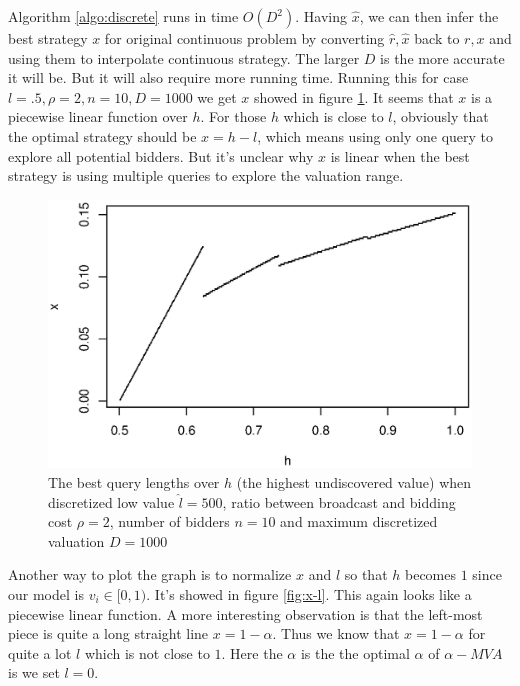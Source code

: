 Algorithm \ref{algo:discrete} runs in time $O(D^2)$. Having $\hat x$, we can
then infer the best strategy $x$ for original continuous problem by converting
$\hat r, \hat x$ back to $r, x$ and using them to interpolate continuous
strategy.  The larger $D$ is the more accurate it will be. But it will also
require more running time.  Running this for case $l = .5, \rho = 2, n = 10, D
= 1000$ we get $x$ showed in figure \ref{fig:x-h}. It seems that $x$ is a
piecewise linear function over $h$.  For those $h$ which is close to
$l$, obviously that the optimal strategy should be $x = h - l$,
which means using only one query to explore all potential bidders. But it's
unclear why $x$ is linear when the best strategy is using multiple queries to
explore the valuation range.

\begin{figure}
\centering
    \includegraphics[trim=0mm 5mm 5mm 15mm, clip, width=\linewidth]{figures/1000-500-2-1-10}
    \caption{The best query lengths over $h$ (the highest
        undiscovered value) when discretized low value $\hat l = 500$,
        ratio between broadcast and bidding cost $\rho = 2$,
        number of bidders $n = 10$ and maximum discretized valuation
        $D = 1000$}\label{fig:x-h}
\end{figure}

Another way to plot the graph is to normalize $x$ and $l$ so that $h$ becomes
$1$ since our model is $v_i \in [0, 1)$. It's showed in figure \ref{fig:x-l}.
This again looks like a piecewise linear function.  A more interesting
observation is that the left-most piece is quite a long straight line $x =
1-\alpha$. Thus we know that $x = 1-\alpha$ for quite a lot $l$ which is not
close to $1$. Here the $\alpha$ is the the optimal $\alpha$ of $\alpha-MVA$ is
we set $l = 0$.

